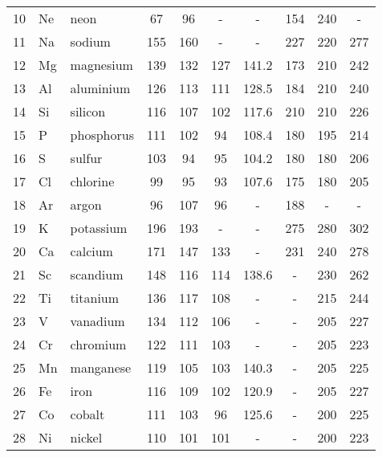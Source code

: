 \documentclass[   %
  final,          %
  a4paper,        %
  8pt
]{extarticle}
\begin{document}
\begin{ThreePartTable}
\begin{longtable}{rll*{7}{S[table-format=3.1, table-space-text-post = , table-align-text-post = false]}}
 10  & Ne   & neon          & 67    & 96    & {-}   & {-}   & 154 & 240        & {-}     \\
 11  & Na   & sodium        & 155   & 160   & {-}   & {-}   & 227 & 220        & 277     \\
 12  & Mg   & magnesium     & 139   & 132   & 127   & 141.2 & 173 & 210        & 242     \\
 13  & Al   & aluminium     & 126   & 113   & 111   & 128.5 & 184 & 210        & 240     \\
 14  & Si   & silicon       & 116   & 107   & 102   & 117.6 & 210 & 210        & 226     \\
 15  & P    & phosphorus    & 111   & 102   & 94    & 108.4 & 180 & 195        & 214     \\
 16  & S    & sulfur        & 103   & 94    & 95    & 104.2 & 180 & 180        & 206     \\
 17  & Cl   & chlorine      & 99    & 95    & 93    & 107.6 & 175 & 180        & 205     \\
 18  & Ar   & argon         & 96    & 107   & 96    & {-}   & 188 & {-}        & {-}     \\
 19  & K    & potassium     & 196   & 193   & {-}   & {-}   & 275 & 280        & 302     \\
 20  & Ca   & calcium       & 171   & 147   & 133   & {-}   & 231 & 240        & 278     \\
 21  & Sc   & scandium      & 148   & 116   & 114   & 138.6 & {-}          & 230        & 262     \\
 22  & Ti   & titanium      & 136   & 117   & 108   & {-}   & {-}          & 215        & 244     \\
 23  & V    & vanadium      & 134   & 112   & 106   & {-}   & {-}          & 205        & 227     \\
 24  & Cr   & chromium      & 122   & 111   & 103   & {-}   & {-}          & 205        & 223     \\
 25  & Mn   & manganese     & 119   & 105   & 103   & 140.3 & {-}          & 205        & 225     \\
 26  & Fe   & iron          & 116   & 109   & 102   & 120.9 & {-}          & 205        & 227     \\
 27  & Co   & cobalt        & 111   & 103   & 96    & 125.6 & {-}          & 200        & 225     \\
 28  & Ni   & nickel        & 110   & 101   & 101   & {-}   & {-}          & 200        & 223     \\

\end{longtable}
\end{ThreePartTable}
\end{document}
